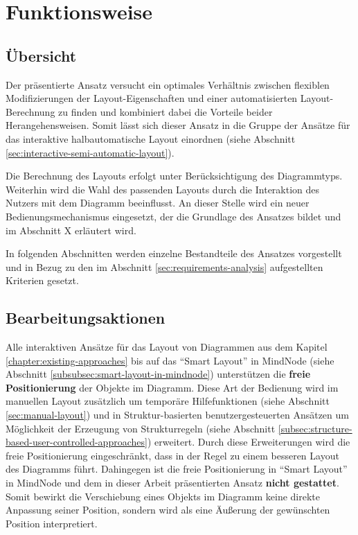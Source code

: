 \begin{enumerate}[label={K.\arabic*}]
\end{enumerate}
    
\section{Funktionsweise}
\label{sec:interactive-approach-functionality}

\subsection{Übersicht}

Der präsentierte Ansatz versucht ein optimales Verhältnis zwischen flexiblen Modifizierungen der Layout-Eigenschaften und einer automatisierten Layout-Berechnung zu finden und kombiniert dabei die Vorteile beider Herangehensweisen. Somit lässt sich dieser Ansatz in die Gruppe der Ansätze für das interaktive halbautomatische Layout einordnen (siehe Abschnitt \ref{sec:interactive-semi-automatic-layout}).

Die Berechnung des Layouts erfolgt unter Berücksichtigung des Diagrammtyps. Weiterhin wird die Wahl des passenden Layouts durch die Interaktion des Nutzers mit dem Diagramm beeinflusst. An dieser Stelle wird ein neuer Bedienungsmechanismus eingesetzt, der die Grundlage des Ansatzes bildet und im Abschnitt X erläutert wird.

In folgenden Abschnitten werden einzelne Bestandteile des Ansatzes vorgestellt und in Bezug zu den im Abschnitt \ref{sec:requirements-analysis} aufgestellten Kriterien gesetzt.

\subsection{Bearbeitungsaktionen}
\label{subsec:edit-actions}

Alle interaktiven Ansätze für das Layout von Diagrammen aus dem Kapitel \ref{chapter:existing-approaches} bis auf das \enquote{Smart Layout} in MindNode (siehe Abschnitt \ref{subsubsec:smart-layout-in-mindnode}) unterstützen die \textbf{freie Positionierung} der Objekte im Diagramm. Diese Art der Bedienung wird im manuellen Layout zusätzlich um temporäre Hilfefunktionen (siehe Abschnitt \ref{sec:manual-layout}) und in Struktur-basierten benutzergesteuerten Ansätzen um Möglichkeit der Erzeugung von Strukturregeln (siehe Abschnitt \ref{subsec:structure-based-user-controlled-approaches}) erweitert. Durch diese Erweiterungen wird die freie Positionierung eingeschränkt, dass in der Regel zu einem besseren Layout des Diagramms führt. Dahingegen ist die freie Positionierung in \enquote{Smart Layout} in MindNode und dem in dieser Arbeit präsentierten Ansatz \textbf{nicht gestattet}. Somit bewirkt die Verschiebung eines Objekts im Diagramm keine direkte Anpassung seiner Position, sondern wird als eine Äußerung der gewünschten Position interpretiert.

